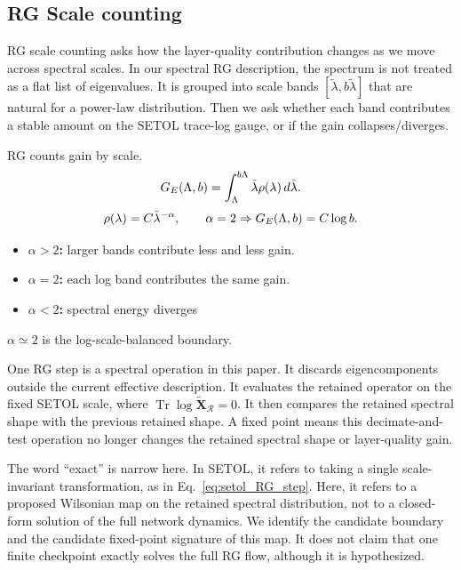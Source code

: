 \documentclass[10pt,twocolumn]{article}
\newcommand{\Tr}{\operatorname{Tr}}
\newcommand{\Xtilde}{\widetilde{\mathbf X}}
\newcommand{\Rell}{\mathcal R}
\newcommand{\takeaway}[1]{%
  \par\vspace{4pt}\noindent\textcolor{boxblue}{#1}%
}
\newcommand{\eqtight}[1]{\[\vspace{-1pt}#1\vspace{-3pt}\]}
\begin{document}
\clearpage

\clearpage
\subsection{RG Scale counting}
\label{sxn:rgcount}

RG scale counting asks how the layer-quality contribution changes as we move
across spectral scales. In our spectral RG description, the spectrum is not treated as a
flat list of eigenvalues. It is grouped into scale bands $[\tilde{\lambda}, b\tilde{\lambda}]$ that are
natural for a power-law distribution.  Then we ask whether each
band contributes a stable amount on the SETOL trace-log gauge, or if the gain collapses/diverges.

\begin{tcolorbox}[marginalbox,title=\textbf{RG boundary}]
RG counts gain by scale.
\eqtight{G_E(\Lambda,b)=\int_\Lambda^{b\Lambda}\tilde{\lambda}\rho({\lambda})\,d\tilde{\lambda}.}
\eqtight{\rho({\lambda})=C\tilde{\lambda}^{-\alpha},\qquad \alpha=2\Rightarrow G_E(\Lambda,b)=C\log b.}
\begin{itemize}
\item \textbf{$\alpha>2$:} larger bands contribute less and less gain.
\item \textbf{$\alpha=2$:} each log band contributes the same gain.
\item \textbf{$\alpha<2$:} spectral energy diverges
\end{itemize}
\takeaway{$\alpha\simeq2$ is the log-scale-balanced boundary.}
\end{tcolorbox}

One RG step is a spectral operation in this paper. It discards eigencomponents outside the current effective description. It evaluates the retained operator on the fixed SETOL scale, where $\Tr{\log \Xtilde_{\Rell}}=0$. It then compares the retained spectral shape with the previous retained shape. A fixed point means this decimate-and-test operation no longer changes the retained spectral shape or layer-quality gain.

The word ``exact'' is narrow here.
In SETOL, it refers to taking a single scale-invariant transformation, as in Eq.~\ref{eq:setol_RG_step}.
Here, it refers to a proposed Wilsonian map on the retained spectral distribution, not to a closed-form solution of the full network dynamics. We identify the candidate boundary and the candidate fixed-point signature of this map. It does not claim that one finite checkpoint exactly solves the full RG flow,
although it is hypothesized.
\end{document}
